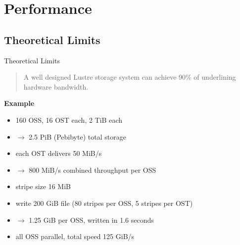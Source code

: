 \section{Performance}
\sectiontoc


\subsection{Theoretical Limits}
\begin{frame}{Theoretical Limits}
    \begin{quote}
        A well designed Lustre storage system can achieve
        90\% of underlining hardware bandwidth.

        \hspace*{}
    \end{quote}

    \pause

    \textbf{Example}

    \begin{itemize}
        \item<+-> 160 OSS, 16 OST each, 2 TiB each
        \item<+-> $\rightarrow$ 2.5 PiB (Pebibyte) total storage
        \item<+-> each OST delivers 50 MiB/s
        \item<+-> $\rightarrow$ 800 MiB/s combined throughput per OSS
        \item<+-> stripe size 16 MiB
        \item<+-> write 200 GiB file (80 stripes per OSS, 5 stripes per OST)
        \item<+-> $\rightarrow$ 1.25 GiB per OSS, written in 1.6 seconds
        \item<+-> all OSS parallel, total speed 125 GiB/s
    \end{itemize}
\end{frame}

